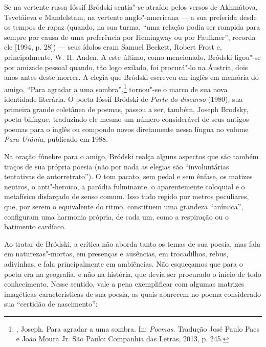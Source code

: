 Se na vertente russa Ióssif Bródski sentia"-se atraído pelos versos de
Akhmátova, Tsvetáieva e Mandelstam, na vertente anglo"-americana --- a sua
preferida desde os tempos de rapaz (quando, na sua turma,
``uma relação podia ser rompida para sempre por causa de uma preferência
por Hemingway ou por Faulkner'', recorda ele [1994, p. 28]) --- seus ídolos eram Samuel
Beckett, Robert Frost e, principalmente, W. H. Auden. A este último, como mencionado, Bródski
ligou"-se por amizade pessoal quando, tão logo exilado, foi procurá"-lo
na Áustria, dois anos antes deste morrer. A
elegia que Bródski escreveu em inglês em memória do amigo, ``Para
agradar a uma sombra'',\footnote{, Joseph. Para agradar a uma sombra.
 In:  \emph{Poemas}. Tradução José Paulo Paes e 
João Moura Jr. São Paulo: Companhia das Letras, 2013, p. 245.} tornou"-se o marco de sua nova identidade
literária. O poeta Ióssif Bródski de \emph{Parte do discurso} (1980), sua primeira grande coletânea de poemas, passou a ser,
também, Joseph Brodsky, poeta bilíngue, traduzindo ele mesmo um
número considerável de seus antigos poemas para o inglês ou compondo
novos diretamente nessa língua no volume \emph{Para Urânia},
publicado em 1988.

Na oração fúnebre para o amigo, Bródski realça alguns
aspectos que são também traços de sua própria poesia (não por nada as elegias são
``involuntárias tentativas de autorretrato''). O tom pacato,
sem pedal e sem ênfase, os matizes neutros, o anti"-heroico, a paródia
fulminante, o aparentemente coloquial e o metafísico disfarçado de senso
comum. Isso tudo regido por metros peculiares, que, por serem o
equivalente do ritmo, constituem uma grandeza ``anímica'', configuram uma
harmonia própria, de cada um, como a respiração ou o batimento cardíaco.

Ao tratar de Bródski, a crítica não aborda tanto os temas de sua poesia, mas
fala em naturezas"-mortas, em presenças e ausências, em trocadilhos, rebus, adivinhas, e fala
principalmente em ambiências. Não esqueçamos que para o poeta era na
geografia, e não na história, que devia ser procurado o início de todo
conhecimento. Nesse sentido, vale a pena exemplificar com algumas
matrizes imagéticas características de sua poesia, as quais aparecem no poema
considerado sua ``certidão de nascimento'':

